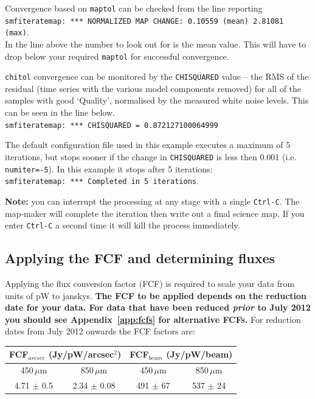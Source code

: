 \documentclass[twoside,11pt]{article}
\newcommand{\htmlref}[2]{#1}
\newcommand{\latexhtml}[2]{#1}
\newcommand{\xlabel}[1]{}
\renewcommand{\_}{\texttt{\symbol{95}}}
\newcommand{\cref}[3]{\latexhtml{#1~\ref{#2}}{\htmlref{#3}{#2}}}
\begin{document}
Convergence based on \texttt{maptol} can be checked from the line
reporting\\
\hspace{5mm}\texttt{smf\_iteratemap: *** NORMALIZED MAP
CHANGE: 0.10559 (mean) 2.81081 (max)}.\\
In the line above the number to look out for is the mean value. This
will have to drop below your required \texttt{maptol} for successful
convergence.

\texttt{chitol} convergence can be monitored by the
\texttt{CHISQUARED} value -- the RMS of the residual (time series with
the various model components removed) for all of the samples with good
`Quality', normalised by the measured white noise levels. This can be
seen in the line below.\\
\hspace{0.5cm}\texttt{smf\_iteratemap: *** CHISQUARED = 0.872127100064999}


The default configuration file used in this example executes a maximum
of 5 iterations, but stops sooner if the change in \texttt{CHISQUARED}
is less then 0.001 (i.e. \texttt{numiter=-5}). In this example it
stops after 5 iterations: \\
\texttt{smf\_iteratemap: *** Completed in 5 iterations}.


\textbf{Note:} you can interrupt the processing at any stage with a
single \texttt{Ctrl-C}. The map-maker will complete the iteration then write
out a final science map. If you enter \texttt{Ctrl-C} a second time it will
kill the process immediately.


\subsection{\xlabel{apply_fcf}Applying the FCF and determining fluxes}
\label{sec:cmult}

Applying the flux conversion factor (FCF) is required to scale your
data from units of pW to janskys. \textbf{The FCF to be applied
depends on the reduction date for your data. For data that have been
reduced \emph{prior} to July 2012 you should see
\cref{Appendix}{app:fcfs}{FCFs by Reduction Date} for alternative FCFs.} For
reduction dates from July 2012 onwards the FCF factors are:
\begin{table}[h!]
\centering
\begin{tabular}{|c|c|c|c|}
\hline
\multicolumn{2}{|c|}{FCF$_{arcsec}$ (Jy/pW/arcsec$^2$) }  &
\multicolumn{2}{c|}{FCF$_{beam}$ (Jy/pW/beam)}      \\
\hline
\hspace{0.4cm} 450\,$\mu$m \hspace{0.3cm} & 850\,$\mu$m & \hspace{0.4cm} 450\,$\mu$m \hspace{0.3cm}& 850\,$\mu$m \\
\hline
4.71 $\pm$ 0.5& 2.34 $\pm$ 0.08& 491 $\pm$ 67& 537 $\pm$ 24 \\
\hline
\end{tabular}
\end{table}
\end{document}
